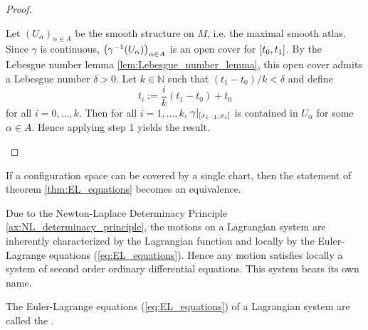 \begin{proof}
\begin{enumerate}[label = \textit{Step \arabic*:},wide=0pt]
			Let $(U_\alpha)_{\alpha \in A}$ be the smooth structure on $M$, i.e. the maximal smooth atlas. Since $\gamma$ is continuous, $\del[1]{\gamma^{-1}(U_\alpha)}_{\alpha \in A}$ is an open cover for $\intcc[0]{t_0,t_1}$. By the Lebesgue number lemma \ref{lem:Lebesgue_number_lemma}, this open cover admits a Lebesgue number $\delta > 0$. Let $k \in \mathbb{N}$ such that $(t_1 - t_0)/k < \delta$ and define
			\begin{equation*}
				t_i := \frac{i}{k}(t_1 - t_0) + t_0
			\end{equation*}
			\noindent for all $i = 0,\dots,k$. Then for all $i = 1,\dots,k$, $\gamma\vert_{\intcc[0]{x_{i - 1},x_i}}$ is contained in $U_\alpha$ for some $\alpha \in A$. Hence applying step $1$ yields the result.
	\end{enumerate}
\end{proof}

\begin{remark}
	\label{rem:global_chart}
	If a configuration space can be covered by a single chart, then the statement of theorem \ref{thm:EL_equations} becomes an equivalence.
\end{remark}

Due to the Newton-Laplace Determinacy Principle \ref{ax:NL_determinacy_principle}, the motions on a Lagrangian system are inherently characterized by the Lagrangian function and locally by the Euler-Lagrange equations (\ref{eq:EL_equations}). Hence any motion satisfies locally a system of second order ordinary differential equations. This system bears its own name.

\begin{definition}
	The Euler-Lagrange equations \textup{(}\ref{eq:EL_equations}\textup{)} of a Lagrangian system are called the .
\end{definition}

